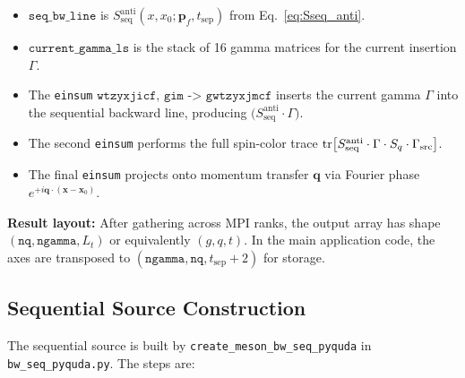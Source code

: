 \documentclass[11pt,a4paper]{article}
\newcommand{\gsrc}{\Gamma_{\text{src}}}
\newcommand{\gcur}{\Gamma}
\newcommand{\Sq}{S_{q}}
\newcommand{\Sseq}{S_{\text{seq}}}
\newcommand{\einsum}{\texttt{einsum}}
\begin{document}
\begin{itemize}[nosep]
  \item \(\texttt{seq\_bw\_line}\) is \(\Sseq^{\text{anti}}(x, x_0;
        \mathbf{p}_f, t_{\text{sep}})\) from Eq.~\eqref{eq:Sseq_anti}.
  \item \(\texttt{current\_gamma\_ls}\) is the stack of 16 gamma matrices for
        the current insertion \(\gcur\).
  \item The \einsum{} \(\texttt{wtzyxjicf, gim -> gwtzyxjmcf}\) inserts the
        current gamma \(\gcur\) into the sequential backward line, producing
        \(\big(\Sseq^{\text{anti}} \cdot \gcur\big)\).
  \item The second \einsum{} performs the full spin-color trace
        \(\tr[\Sseq^{\text{anti}} \cdot \gcur \cdot \Sq \cdot \gsrc]\).
  \item The final \einsum{} projects onto momentum transfer \(\mathbf{q}\) via
        Fourier phase \(e^{+i\mathbf{q}\cdot(\mathbf{x}-\mathbf{x}_0)}\).
\end{itemize}

\textbf{Result layout:} After gathering across MPI ranks, the output array has
shape \((\texttt{nq}, \texttt{ngamma}, L_t)\) or equivalently
\((g, q, t)\).  In the main application code, the axes are transposed to
\((\texttt{ngamma}, \texttt{nq}, t_{\text{sep}}+2)\) for storage.

\subsection{Sequential Source Construction}

The sequential source is built by \texttt{create\_meson\_bw\_seq\_pyquda} in
\texttt{bw\_seq\_pyquda.py}.  The steps are:
\end{document}
